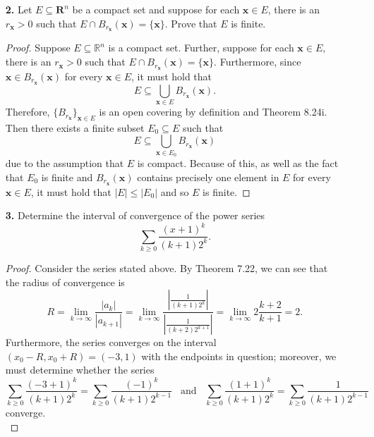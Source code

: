 \documentclass[ 12pt ]{article}
\begin{document}
\begin{enumerate}
\begin{proof}
			I claim that $f$ is not differentiable at $\textbf{0}$. Suppose by contradiction that $f$ is differentiable at $\textbf{0}$. Then $Df(0, 0) = \nabla f(0, 0) =
			(0, -1)$ by Theorem 11.14. Additionally, $$\lim_{(h, k) \to \textbf{0}} \frac{f(h, k) - f(0, 0) - \nabla f(0, 0) \cdot (h, k)}{||(h, k)||} = 0$$ by definition.
			However, the linear path $h = k$ provides $$\lim_{(h, h) \to \textbf{0}} \frac{f(h, h) - f(0, 0) - \nabla f(0, 0) \cdot (h, h)}{||(h, h)||} = \lim_{h \to 0}
			\frac{\frac{h^3 - h^3}{2h^2} - 0 + h}{\sqrt{2} h} = \frac{1}{\sqrt{2}}$$ which is a contradiction.
		\end{proof}


	\item[\textbf{2.}] Let $E \subseteq \textbf{R}^n$ be a compact set and suppose for each $\textbf{x} \in E$, there is an $r_{\textbf{x}} > 0$ such that $E \cap
		B_{r_{\textbf{x}}}(\textbf{x}) = \{ \textbf{x} \}$. Prove that $E$ is finite.

		\begin{proof}
			Suppose $E \subseteq \mathbb{R}^n$ is a compact set. Further, suppose for each $\textbf{x} \in E$, there is an $r_{\textbf{x}} > 0$ such that $E \cap
			B_{r_{\textbf{x}}}(\textbf{x}) = \{ \textbf{x} \}$. Furthermore, since $\textbf{x} \in B_{r_{\textbf{x}}}(\textbf{x})$ for every $\textbf{x} \in E$, it must
			hold that $$E \subseteq \bigcup_{\textbf{x} \in E} B_{r_{\textbf{x}}}(\textbf{x}).$$ Therefore, $\{ B_{r_{\textbf{x}}} \}_{\textbf{x} \in E}$ is an open covering
			by definition and Theorem 8.24i. Then there exists a finite subset $E_0 \subseteq E$ such that $$E \subseteq \bigcup_{\textbf{x} \in E_0}
			B_{r_{\textbf{x}}}(\textbf{x})$$ due to the assumption that $E$ is compact. Because of this, as well as the fact that $E_0$ is finite and $B_{r_{\textbf{x}}}
			(\textbf{x})$ contains precisely one element in $E$ for every $\textbf{x} \in E$, it must hold that $|E| \leq |E_0|$ and so $E$ is finite.
		\end{proof}


	\item[\textbf{3.}] Determine the interval of convergence of the power series $$\sum_{k \geq 0} \frac{(x+1)^k}{(k+1)2^k}.$$

		\begin{proof}
			Consider the series stated above. By Theorem 7.22, we can see that the radius of convergence is $$R = \lim_{k \to \infty} \frac{|a_k|}{|a_{k+1}|} = \lim_{k \to
			\infty} \frac{\left | \frac{1}{(k+1)2^k} \right |}{\left | \frac{1}{(k+2)2^{k+1}} \right |} = \lim_{k \to \infty} 2\frac{k+2}{k+1} = 2.$$ Furthermore, the series
			converges on the interval $(x_0 - R, x_0 + R) = (-3, 1)$ with the endpoints in question; moreover, we must determine whether the series $$\sum_{k \geq 0}
			\frac{(-3 + 1)^k}{(k+1)2^k} = \sum_{k \geq 0} \frac{(-1)^k}{(k+1)2^{k-1}}\;\;\; \mathrm{and}\;\;\; \sum_{k \geq 0} \frac{(1 + 1)^k}{(k+1)2^k} = \sum_{k \geq 0}
			\frac{1}{(k+1)2^{k-1}}$$ converge. \\


\end{proof}
\end{enumerate}
\end{document}
